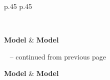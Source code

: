 \documentclass{fairmeta}
\begin{document}
\begin{longtable}{p{} p{}}

\caption{HuggingFace models in the run's cache (alphabetically sorted)} \label{tab:allowed_models} \\

\toprule

\textbf{Model} & \textbf{Model} \\

\midrule

\endfirsthead

%
{{\tablename\ \thetable{} -- continued from previous page}} \\

\toprule

\textbf{Model} & \textbf{Model} \\

\midrule

\endhead

\midrule {} \\

\endfoot

\bottomrule

\endlastfoot


\end{longtable}
\end{document}
